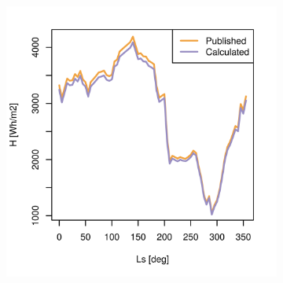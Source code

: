 \begin{figure}[H]
\captionsetup[subfigure]{justification=centering}
\vspace{-2ex}
\centering
    \setlength{\subfigureWidth}{0.50\textwidth}
    \setlength{\graphicsHeight}{80mm}
    \hypersetup{hidelinks=true}%
    \begin{subfigure}[t]{\subfigureWidth}
        \centering
            \includegraphics[height=\graphicsHeight]{sections/appendix/insolation-calculation-verification/plots/h-exp-calc-at-vl1-with-beta-65-deg.png}
            \label{fig:sub:comparative-global-insolation-at-vl1-beta-optimal-daily-variations}
    \end{subfigure}\hfill
    \begin{subfigure}[t]{\subfigureWidth}
        \centering

\end{subfigure}
\end{figure}
